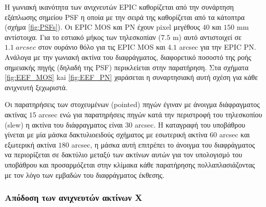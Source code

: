 Η γωνιακή ικανότητα των ανιχνευτών \textlatin{EPIC} καθορίζεται από την συνάρτηση εξάπλωσης σημείου \textlatin{PSF} η οποία με την σειρά της καθορίζεται από τα κάτοπτρα (σχήμα \ref{fig:PSFs}). Οι \textlatin{EPIC MOS} και ΡΝ έχουν \textlatin{pixel} μεγέθους $40$ και $150$ m\textlatin{m} αντίστοιχα. Για το εστιακό μήκος των τηλεσκοπίαν ($7.5$ \textlatin{m}) αυτό αντιστοιχεί σε $1.1\; arcsec$ στον ουράνιο θόλο για τις \textlatin{EPIC MOS} και $4.1$ \textlatin{arcsec} για την \textlatin{EPIC PN}.\\
Ανάλογα με την γωνιακή ακτίνα του διαφράγματος, διαφορετικό ποσοστό της ροής σημειακής πηγής (δηλαδή της \textlatin{PSF}) περικλείεται στην παρατήρηση. Στα σχήματα \ref{fig:EEF_MOS} kai \ref{fig:EEF_PN} χαράσεται η συναρτησιακή αυτή σχέση για κάθε ανιχνευτή ξεχωριστά. 

Οι παρατηρήσεις των στοχευμένων \textlatin{(pointed)} πηγών έγιναν με άνοιγμα διάφραγματος ακτίνας $15$ \textlatin{arcsec} ενώ για παρατηρήσεις πηγών κατά την περιστροφή του τηλεσκοπίου \textlatin{(slew)} η ακτίνα του διάφραγματος είναι $30$ \textlatin{arcsec}\cite{RapidXMM}.
H καταγραφή του υποβάθρου γίνεται με μία μάσκα δακτυλιοειδούς σχήματος με εσωτερική ακτίνα $60$ \textlatin{arcsec} και εξωτερική ακτίνα $180$ \textlatin{arcsec}, η μάσκα αυτή επιτρέπει το άνοιγμα του διαφράγματος να περιορίζεται σε δακτύλιο μεταξύ των ακτίνων αυτών για τον υπολογισμό του υποβάθρου και προσαρμόζεται στην κλίμακα κάθε παρατήρησης πολλαπλασιάζοντας με τον λόγο των εμβαδών του διαφράγματος έκθεσης\cite{RapidXMM}. 

\subsubsection*{Απόδοση των ανιχνευτών ακτίνων Χ}

